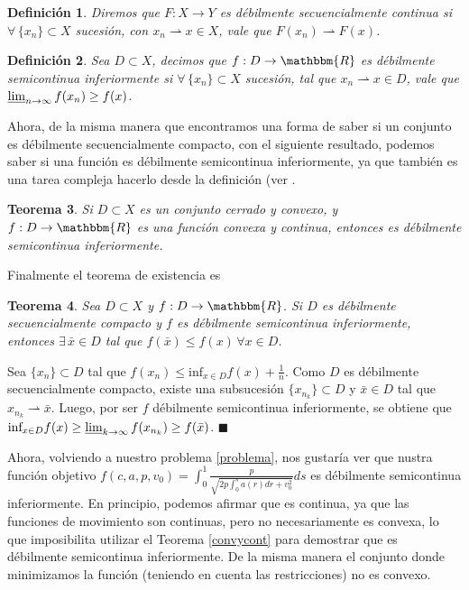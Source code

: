 \documentclass[a4paper,10pt]{book}
\newcommand{\R}{\mathbbm{R}}
\newcommand{\arr}{\rightarrow}
\newcommand{\bx}{\bar{x}}
\newcommand{\deb}{\rightharpoonup}
\newtheorem{teo}{Teorema}[section]
\newtheorem{defi}[teo]{Definici\'on}
\newenvironment{dem}{\vspace*{-0.1cm}{\it Demostraci\'on:}}{\hfill
$\blacksquare$\\}
\begin{document}
\begin{defi}
 Diremos que $F:X\arr Y$ es débilmente secuencialmente continua si $\forall\, \{x_n\}\subset X$ sucesión, con $x_n\deb x\in X$, vale que $F(x_n)\deb F(x)$.
\end{defi}

\begin{defi}
 Sea $D\subset X$, decimos que $f:D\arr\R$ es débilmente semicontinua inferiormente si $\forall\, \{x_n\}\subset X$ sucesión, tal que $x_n\deb x\in D$,  vale que $\varliminf_{n \to \infty} f(x_n)\geq f(x)$.
\end{defi}

Ahora, de la misma manera que encontramos una forma de saber si un conjunto es débilmente secuencialmente compacto, con el siguiente resultado, podemos saber si una función es débilmente semicontinua inferiormente, ya que también es una tarea compleja hacerlo desde la definición (ver \cite[Corollary 3.9.]{brezis2010functional}.

\begin{teo}\label{convycont}
Si $D\subset X$ es un conjunto cerrado y convexo, y $f:D\arr\R$ es una función convexa y continua, entonces es débilmente semicontinua inferiormente.
\end{teo}

Finalmente el teorema de existencia es
\begin{teo}\label{globalsol}
Sea $D\subset X$ y $f:D\arr\R$. Si $D$ es débilmente secuencialmente compacto y $f$ es débilmente semicontinua inferiormente, entonces $\exists\, \bx\in D$ tal que $f(\bx)\leq f (x)\,\forall x\in D$.
\end{teo}
\begin{dem}
Sea $\{x_n\}\subset D$ tal que $f(x_n)\leq \mbox{inf}_{x\in D}f(x)+\frac{1}{n}$. Como $D$ es débilmente secuencialmente compacto, existe una subsucesión $\{x_{n_k}\}\subset D$ y $\bx\in D$ tal que $x_{n_k}\deb\bx$. Luego, por ser $f$ débilmente semicontinua inferiormente, se obtiene que $\mbox{inf}_{x\in D}f(x)\geq\varliminf_{k\to\infty}f(x_{n_k})\geq f(\bx)$.
\end{dem}

Ahora, volviendo a nuestro problema \eqref{problema}, nos gustaría ver que nustra función objetivo $f(c,a,p,v_0)=\int_{0}^{1} \frac{p}{\sqrt{2p \int_0^s a(r)dr + v_0^2}}ds$ es débilmente semicontinua inferiormente. En principio, podemos afirmar que es continua, ya que las funciones de movimiento son continuas, pero no necesariamente es convexa, lo que imposibilita utilizar el Teorema \eqref{convycont} para demostrar que es débilmente semicontinua inferiormente. De la misma manera el conjunto donde minimizamos la función (teniendo en cuenta las restricciones) no es convexo.
\end{document}
